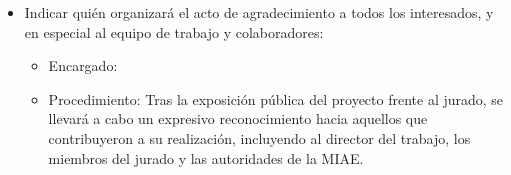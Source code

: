 \documentclass[
11pt, %
]{charter}
\begin{document}
\begin{itemize}
	\item Indicar quién organizará el acto de agradecimiento a todos los interesados, y en especial al equipo de trabajo y colaboradores:\\
    \begin{itemize}
        \item Encargado: \authorname
        \item Procedimiento: Tras la exposición pública del proyecto frente al jurado, se llevará a cabo un expresivo reconocimiento hacia aquellos que contribuyeron a su realización, incluyendo al director del trabajo, los miembros del jurado y las autoridades de la MIAE.
    \end{itemize}
\end{itemize}
\end{document}
